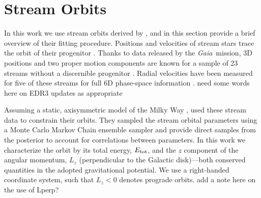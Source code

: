 \documentclass[twocolumn]{aastex63}
\newcommand{\gaia}{\textsl{Gaia}}
\begin{document}
% 

\section{Stream Orbits}
In this work we use stream orbits derived by \citet{bk2021}, and in this section provide a brief overview of their fitting procedure.
Positions and velocities of stream stars trace the orbit of their progenitor \citep[e.g.,][]{kuepper2010}.
Thanks to data released by the \gaia\ mission, 3D positions and two proper motion components are known for a sample of 23 streams without a discernible progenitor \citep{ibata2019, shipp2019, riley2020}.
Radial velocities have been measured for five of these streams for full 6D phase-space information \citep{caldwell2020, li2020, bonaca2020b}.  {\color{red} need some words here on EDR3 updates as appropriate}


Assuming a static, axisymmetric model of the Milky Way \citep[default \texttt{MilkyWayPotential}]{gala}, \citet{bk2021} used these stream data to constrain their orbits.
They sampled the stream orbital parameters using a Monte Carlo Markov Chain ensemble sampler and provide direct samples from the posterior to account for correlations between parameters.
In this work we characterize the orbit by its total energy, $E_{\rm tot}$, and the $z$ component of the angular momentum, $L_z$ (perpendicular to the Galactic disk)---both conserved quantities in the adopted gravitational potential.
We use a right-handed coordinate system, such that $L_z<0$ denotes prograde orbits. {\color{red} add a note here on the use of Lperp?}
\end{document}
